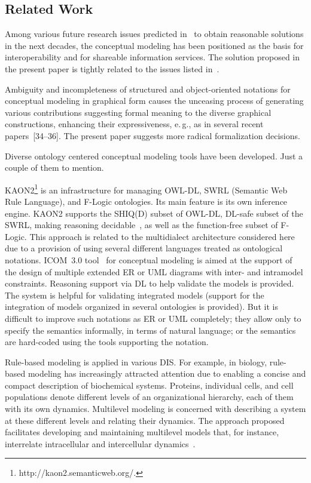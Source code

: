 \begin{multicols}{2}
\section{Related Work}


  Among various future research issues predicted in~\cite{36-kal} to obtain
reasonable solutions in the next decades, the conceptual modeling has been positioned
as the basis for interoperability and for shareable information services. The solution
proposed in the present paper is tightly related to the issues listed in~\cite{36-kal}.

  Ambiguity and incompleteness of structured and object-oriented notations for
conceptual modeling in graphical form causes the unceasing process of generating
various contributions suggesting formal meaning to the diverse graphical
constructions, enhancing their expressiveness, e.\,g., as in several recent
papers~[34--36]. The present paper suggests more radical formalization
decisions.

  Diverse ontology centered conceptual modeling tools have been developed. Just a
couple of them to mention.

KAON2\footnote{{\sf http://kaon2.semanticweb.org/}.} is an infrastructure for managing
OWL-DL, SWRL (Semantic Web Rule Language), and \mbox{F-Logic} ontologies. Its main feature is its own inference engine.
KAON2 supports the SHIQ(D) subset of OWL-DL, DL-safe subset of the SWRL,
making reasoning decidable~\cite{40-kal}, as well as the
function-free subset of F-Logic. This approach is related to the multidialect architecture considered
here due to a provision of using several different languages treated as ontological notations.
  ICOM~3.0 tool~\cite{41-kal} for conceptual modeling is aimed at the support of
the design of multiple extended ER or UML diagrams with inter- and intramodel
constraints. Reasoning support via DL to help validate the models is
provided. The system is helpful for validating integrated models (support for the
integration of models organized in several ontologies is provided). But it is difficult to
improve such notations as ER or UML completely; they allow only to specify the
semantics informally, in terms of natural language; or the semantics are hard-coded
using the tools supporting the notation.

  Rule-based modeling is applied in various DIS. For example, in biology, rule-based
modeling has increasingly attracted attention due to enabling a concise and compact
description of biochemical systems. Proteins, individual cells, and cell populations
denote different levels of an organizational hierarchy, each of them with its own
dynamics. Multilevel modeling is concerned with describing a system at these
different levels and relating their dynamics. The approach proposed facilitates
developing and maintaining multilevel models that, for instance, interrelate
intracellular and intercellular dynamics~\cite{42-kal}.


\end{multicols}
